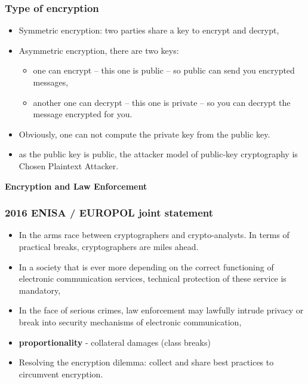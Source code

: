 \documentclass{beamer}
\begin{document}
\begin{frame}
        \frametitle{Type of encryption}

        \begin{itemize}
          \item Symmetric encryption: two parties share a key to encrypt and decrypt,
          \item Asymmetric encryption, there are two keys:
            
        \begin{itemize}
        \item one can encrypt -- this one is public -- so public can send you
          encrypted messages,
         \item another one can decrypt -- this one is private -- so you can
           decrypt the message encrypted for you.
        \end{itemize}
        \item Obviously, one can not compute the private key from the public key.
        \item as the public key is public, the attacker model of public-key
          cryptography is Chosen Plaintext Attacker.
        \end{itemize}

\end{frame}



\begin{frame}
  \begin{center}
    {\bf Encryption and Law Enforcement}
  \end{center}
\end{frame}

\begin{frame}
        \frametitle{2016 ENISA / EUROPOL joint statement}
        \begin{itemize}
          \item In the arms race between cryptographers and crypto-analysts. In
            terms of practical breaks, cryptographers are miles ahead.
          \item In a society that is ever more depending on the correct
            functioning of electronic communication services, technical
            protection of these service is mandatory,
          \item In the face of serious crimes, law enforcement may lawfully
            intrude privacy or break into security mechanisms of electronic communication,
          \item {\bf proportionality} - collateral damages (class breaks)
          \item Resolving the encryption dilemma: collect and share best
            practices to circumvent encryption.
        \end{itemize}
\end{frame}
\end{document}
